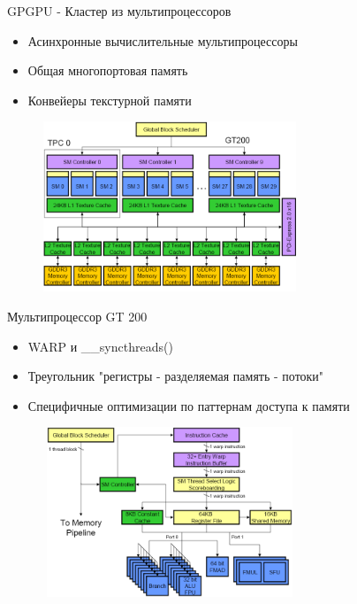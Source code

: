 \begin{frame}{GPGPU - Кластер из мультипроцессоров\cite{web:rwgpu}}

\begin{itemize}
  \item Асинхронные вычислительные мультипроцессоры
  \item Общая многопортовая память
  \item Конвейеры текстурной памяти
\end{itemize}



\begin{figure}
\centering
\includegraphics[height=2in, width=3in]{artwork/images/board}
\label{fig:board}
\end{figure}

\end{frame}

\begin{frame}{Мультипроцессор GT 200\cite{web:rwgpu}}
\begin{itemize}
  \item WARP и \_\_syncthreads()
  \item Треугольник "регистры - разделяемая память - потоки"
  \item Специфичные оптимизации по паттернам доступа к памяти
\end{itemize}



\begin{figure}
\centering
\includegraphics[height=2in, width=3in]{artwork/images/SM}
\label{fig:sm}
\end{figure}

\end{frame}


